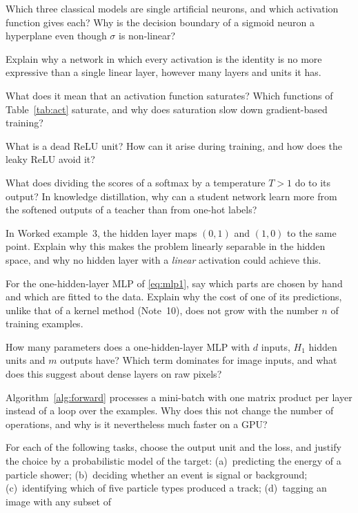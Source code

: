 \documentclass[11pt]{article}
\begin{document}
\begin{questions}
\begin{conceptual}
\item Which three classical models are single artificial neurons, and which activation function gives each? Why is the
  decision boundary of a sigmoid neuron a hyperplane even though $\sigma$ is non-linear?
\item Explain why a network in which every activation is the identity is no more expressive than a single linear layer,
  however many layers and units it has.
\item What does it mean that an activation function saturates? Which functions of Table~\ref{tab:act} saturate, and why
  does saturation slow down gradient-based training?
\item What is a dead ReLU unit? How can it arise during training, and how does the leaky ReLU avoid it?
\item What does dividing the scores of a softmax by a temperature $T > 1$ do to its output? In knowledge distillation,
  why can a student network learn more from the softened outputs of a teacher than from one-hot labels?
\item In Worked example~3, the hidden layer maps $(0, 1)$ and $(1, 0)$ to the same point. Explain why this makes the
  problem linearly separable in the hidden space, and why no hidden layer with a \emph{linear} activation could achieve
  this.
\item For the one-hidden-layer MLP of \eqref{eq:mlp1}, say which parts are chosen by hand and which are fitted to the
  data. Explain why the cost of one of its predictions, unlike that of a kernel method (Note~10), does not grow with
  the number $n$ of training examples.
\item How many parameters does a one-hidden-layer MLP with $d$ inputs, $H_1$ hidden units and $m$ outputs have? Which
  term dominates for image inputs, and what does this suggest about dense layers on raw pixels?
\item Algorithm~\ref{alg:forward} processes a mini-batch with one matrix product per layer instead of a loop over the
  examples. Why does this not change the number of operations, and why is it nevertheless much faster on a GPU?
\item For each of the following tasks, choose the output unit and the loss, and justify the choice by a probabilistic
  model of the target: (a)~predicting the energy of a particle shower; (b)~deciding whether an event is signal or
  background; (c)~identifying which of five particle types produced a track; (d)~tagging an image with any subset of

\end{conceptual}
\end{questions}
\end{document}
